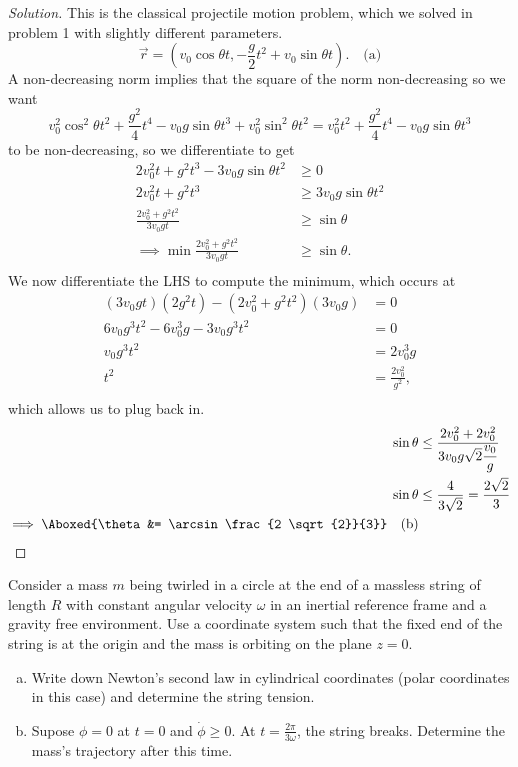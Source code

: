 \documentclass{article}
\begin{document}
\begin{proof}[Solution]
This is the classical projectile motion problem, which we solved in
problem 1 with slightly different parameters.
\[ \vec{r} = \left(v_0 \cos \theta t, -\frac{g}{2} t^2 + v_0 \sin \theta
t \right). \quad \textrm{(a)} \]
A non-decreasing norm implies that the square of the norm non-decreasing
so we want
\[ v_0^2 \cos^2 \theta t^2 + \frac{g^2}{4} t^4 - v_0 g \sin \theta t^3 +
v_0^2 \sin^2 \theta t^2  = v_0^2 t^2 + \frac{g^2}{4} t^4 - v_0 g \sin
\theta t^3 \]
to be non-decreasing, so we differentiate to get
\[ \begin{aligned}
2v_0^2 t + g^2 t^3 - 3 v_0 g \sin \theta t^2 &\geq 0 \\
2v_0^2 t + g^2 t^3 &\geq 3 v_0 g \sin \theta t^2 \\
\frac{2 v_0^2 + g^2 t^2}{3 v_0 g t} &\geq \sin \theta \\
\implies \min \frac{2 v_0^2 + g^2 t^2}{3 v_0 g t} &\geq \sin \theta. \\
\end{aligned} \]
We now differentiate the LHS to compute the minimum, which occurs at
\[ \begin{aligned}
(3v_0 gt) (2 g^2 t) - (2 v_0^2 + g^2 t^2)(3v_0 g) &= 0 \\
6 v_0 g^3 t^2 - 6v_0^3 g - 3 v_0 g^3t^2 &= 0 \\
v_0 g^3 t^2 &= 2 v_0^3 g \\
t^2 &= \frac{2 v_0^2}{g^2}, \\
\end{aligned} \]
which allows us to plug back in.
\[ \begin{aligned}
\sin \theta &\leq \frac{2v_0^2 + 2v_0^2}{3 v_0 g \sqrt{2} \dfrac{v_0}{g}} \\
\sin \theta &\leq \frac{4}{3 \sqrt{2}} = \frac{2 \sqrt{2}}{3} \\
\implies \Aboxed{\theta &= \arcsin \frac{2 \sqrt{2}}{3}} \quad
\textrm{(b)} \\
\end{aligned} \]
\end{proof}

\begin{prb}
Consider a mass $m$ being twirled in a circle at the end of a massless
string of length $R$ with constant angular velocity $\omega$ in an
inertial reference frame and a gravity free environment. Use a
coordinate system such that the fixed end of the string is at the origin
and the mass is orbiting on the plane $z = 0$.
\begin{enumerate}[(a)]
\item Write down Newton's second law in cylindrical coordinates (polar
coordinates in this case) and determine the string tension.
\item Supose $\phi = 0$ at $t = 0$ and $\dot{\phi} \geq 0$. At $t =
\frac{2 \pi}{3 \omega}$, the string breaks. Determine the mass's
trajectory after this time.
\end{enumerate}
\end{prb}
\end{document}
